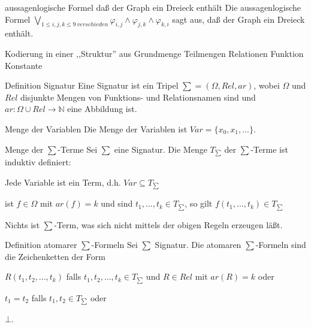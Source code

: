 \documentclass[avery5371]{flashcards}
\begin{document}
\begin{flashcard}[ Prädikatenlogik ]{ aussagenlogische Formel daß der Graph ein Dreieck enthält }
    Die aussagenlogische Formel $\bigvee_{1\leq i,j,k\leq 9\ verschieden} \varphi_{i,j}\wedge\varphi_{j,k}\wedge\varphi_{k,i}$ sagt aus, daß der Graph ein Dreieck enthält.
\end{flashcard}

\begin{flashcard}[ Prädikatenlogik ]{ Kodierung in einer ,,Struktur'' aus }
    Grundmenge
    Teilmengen
    Relationen
    Funktion
    Konstante
\end{flashcard}

\begin{flashcard}[ Prädikatenlogik ]{ Definition Signatur }
    Eine Signatur ist ein Tripel $\sum=(\Omega, Rel,ar)$, wobei $\Omega$ und $Rel$ disjunkte Mengen von Funktions- und Relationsnamen sind und $ar:\Omega\cup Rel\rightarrow\mathbb{N}$ eine Abbildung ist.
\end{flashcard}

\begin{flashcard}[ Prädikatenlogik ]{ Menge der Variablen }
    Die Menge der Variablen ist $Var=\{x_0,x_1 ,...\}$.
\end{flashcard}

\begin{flashcard}[ Prädikatenlogik ]{ Menge der $\sum$-Terme }
    Sei $\sum$ eine Signatur. Die Menge $T_{\sum}$ der $\sum$-Terme ist induktiv definiert:
    \begin{enumerate*}
        \item Jede Variable ist ein Term, d.h. $Var\subseteq T_{\sum}$
        \item ist $f\in\Omega$ mit $ar(f)=k$ und sind $t_1,...,t_k\in T_{\sum}$, so gilt $f(t_1,...,t_k)\in T_{\sum}$
        \item Nichts ist $\sum$-Term, was sich nicht mittels der obigen Regeln erzeugen läßt.
    \end{enumerate*}
\end{flashcard}

\begin{flashcard}[ Prädikatenlogik ]{ Definition atomarer $\sum$-Formeln }
    Sei $\sum$ Signatur. Die atomaren $\sum$-Formeln sind die Zeichenketten der Form
    \begin{itemize*}
        \item $R(t_1,t_2,...,t_k)$ falls $t_1,t_2,...,t_k\in T_{\sum}$ und $R\in Rel$ mit $ar(R)=k$ oder
        \item $t_1=t_2$ falls $t_1,t_2\in T_{\sum}$ oder
        \item $\bot$.
    \end{itemize*}
\end{flashcard}
\end{document}
